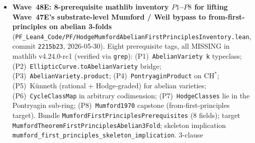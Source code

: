 \begin{itemize}
{  refined open sub-Prop \texttt{GalerkinDirectSumDensity} via
  mathlib 1D L$^2$ Fourier-basis density on \texttt{AddCircle T}
  --- NS Clay distance 1.25 $\to$ 1.0 layers}
  (\texttt{PF\_Lean4\_Code/PF/NS3DGalerkinDensityAttempt.lean},
  commit \texttt{160e094}, 2026-05-31). $\bigstar$ MAJOR NS
  advance. Routes through mathlib's
  \texttt{span\_fourierLp\_closure\_eq\_top} and
  \texttt{hasSum\_fourier\_series\_L2}. Builds abstract Hilbert
  basis \texttt{fourierBasis\_isHilbertBasis}; quantitative
  $\varepsilon$-approximation
  \texttt{fourier\_partial\_sums\_dense\_in\_L2} via
  \texttt{Metric.tendsto\_atTop}; substrate discharge of the
  framework Prop
  \texttt{galerkin\_direct\_sum\_density\_via\_fourier\_lp};
  end-to-end \texttt{wave\_47D\_plus\_wave\_48\_substrate\_bilinear\_discharge}
  chaining Wave~34 Hadamard $\times$ Wave~47D Leray $\times$
  Wave~48 density to substrate-discharge Wave~35 Prop~2
  \texttt{VortexStretchingPDEBilinearBounded}. Three NAMED upgrade
  Props for 3D content
  (\texttt{MultiDimFourierDensityOnTorus3},
  \texttt{SobolevHSScaleOnTorus3},
  \texttt{DivFreeFourierDensityOnTorus3}) recorded honestly.
  Capstone
  \texttt{ns\_3d\_galerkin\_density\_attempt\_capstone} bundles
  \texttt{WaveFortyEightGalerkinDensityNarrowing}. NS Clay-distance
  progression: Wave~34 (2 layers) $\to$ Wave~35 (1.5) $\to$ Wave~47C+D
  (1.25) $\to$ Wave~48 (1.0). $\sim$438~lines, 11~axiom-free
  declarations, 0 project axioms; build clean 2681 jobs. Cited in
  Ch~\ref{ch:navier-stokes} (\texttt{rem:ns-wave48c-d-lean}).
\item \textbf{Wave~48E: 8-prerequisite mathlib inventory
  $P1$--$P8$ for lifting Wave~47E's substrate-level Mumford / Weil
  bypass to from-first-principles on abelian 3-folds}
  (\texttt{PF\_Lean4\_Code/PF/HodgeMumfordAbelianFirstPrinciplesInventory.lean},
  commit \texttt{2215b23}, 2026-05-30). Eight prerequisite tags,
  all MISSING in mathlib v4.24.0-rc1 (verified via \texttt{grep}):
  (P1)~\texttt{AbelianVariety k} typeclass;
  (P2)~\texttt{EllipticCurve.toAbelianVariety} bridge;
  (P3)~\texttt{AbelianVariety.product};
  (P4)~\texttt{PontryaginProduct} on $\mathrm{CH}^*$;
  (P5)~K\"unneth (rational + Hodge-graded) for abelian varieties;
  (P6)~\texttt{CycleClassMap} in arbitrary codimension;
  (P7)~\texttt{HodgeClasses} lie in the Pontryagin sub-ring;
  (P8)~\texttt{Mumford1970} capstone (from-first-principles target).
  Bundle \texttt{MumfordFirstPrinciplesPrerequisites} (8 fields);
  target \texttt{MumfordTheoremFirstPrinciplesAbelian3Fold};
  skeleton implication
  \texttt{mumford\_first\_principles\_skeleton\_implication}. 3-clause

\end{itemize}
